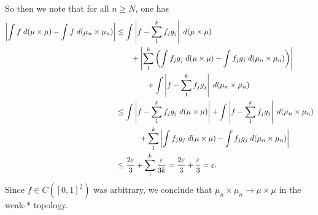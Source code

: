 \documentclass{article}
\begin{document}
	So then we note that for all $n \geq N$, one has 
	\begin{align*}
		\begin{split}
			\left| \int f\;d(\mu\times \mu) - \int f\;d(\mu_n \times \mu_n) \right|&\leq \int \left| f - \sum_{1}^{k}f_{j}g_{j} \right|\;d(\mu\times\mu) \\
			&\qquad + \left| \sum_{1}^{k}\left(\int f_{j}g_{j}\;d(\mu\times\mu) - \int f_{j}g_{j}\;d(\mu_n\times\mu_n)\right) \right| \\
			&\qquad\qquad + \int \left| f - \sum_{1}^{k}f_{j}g_{j} \right|\;d(\mu_n\times\mu_n) \\
			&\leq \int \left| f - \sum_1^kf_jg_j\;d(\mu \times \mu) \right| + \int \left| f - \sum_1^kf_jg_j \right|\;d(\mu_n\times\mu_n) \\
			&\qquad \quad + \sum_1^k\left| \int f_jg_j\;d(\mu\times\mu) - \int f_jg_j\;d(\mu_n\times\mu_n) \right| \\
			&\leq \frac{2\varepsilon}{3} + \sum_{1}^{k}\frac{\varepsilon}{3k}  = \frac{2\varepsilon}{3} + \frac{\varepsilon}{3} = \varepsilon. 
		\end{split}
	\end{align*}
	Since $f\in C([0,1]^2)$ was arbitrary, we conclude that $\mu_n \times \mu_n \to \mu \times \mu$ in the weak-$\ast$ topology. 
	
\end{document}
